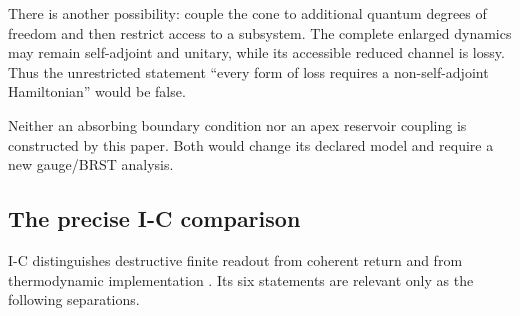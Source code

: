 \documentclass[11pt,a4paper]{article}
\theoremstyle{plain}
\theoremstyle{definition}
\theoremstyle{remark}
\numberwithin{equation}{section}
\begin{document}
There is another possibility: couple the cone to additional quantum
degrees of freedom and then restrict access to a subsystem.
The complete enlarged dynamics may remain self-adjoint and unitary,
while its accessible reduced channel is lossy.
Thus the unrestricted statement
``every form of loss requires a non-self-adjoint Hamiltonian''
would be false.

Neither an absorbing boundary condition nor an apex reservoir
coupling is constructed by this paper.
Both would change its declared model and require a new
gauge/BRST analysis.

\subsection{The precise I-C comparison}

I-C distinguishes destructive finite readout from coherent return
and from thermodynamic implementation \cite{CheungIC}.
Its six statements are relevant only as the following separations.
\end{document}
